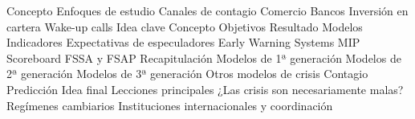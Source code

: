 \documentclass{nuevotema}
\begin{document}
\begin{esquema}[enumerate]
			\3 Concepto
			\3 Enfoques de estudio
		\2 Canales de contagio
			\3 Comercio
			\3 Bancos
			\3 Inversión en cartera
			\3 Wake-up calls
	\1 
		\2 Idea clave
			\3 Concepto
			\3 Objetivos
			\3 Resultado
		\2 Modelos
			\3 Indicadores
			\3 Expectativas de especuladores
			\3 Early Warning Systems
			\3 MIP Scoreboard
			\3 FSSA y FSAP
	\1[] 
		\2 Recapitulación
			\3 Modelos de 1ª generación
			\3 Modelos de 2ª generación
			\3 Modelos de 3ª generación
			\3 Otros modelos de crisis
			\3 Contagio
			\3 Predicción
		\2 Idea final
			\3 Lecciones principales
			\3 ¿Las crisis son necesariamente malas?
			\3 Regímenes cambiarios
			\3 Instituciones internacionales y coordinación

\end{esquema}

\esquemalargo
\end{document}
